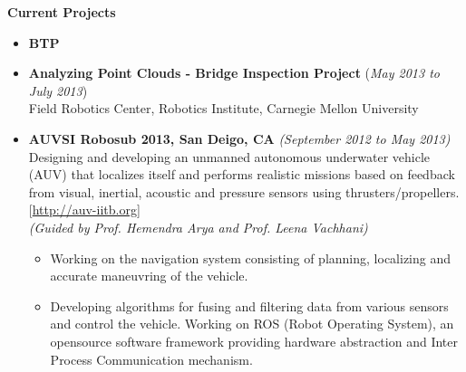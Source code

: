 \documentclass[a4paper,11pt]{article}
\newcommand{\resheading}[1]{{\small \colorbox{mygrey}{\begin{minipage}{0.975\textwidth}{\textbf{#1 \vphantom{p\^{E}}}}\end{minipage}}}}
\begin{document}
\resheading{\textbf{\large{Current Projects}}}
\begin{itemize}

    \item \textbf{BTP}

    \item \textbf{Analyzing Point Clouds - Bridge Inspection Project} \hfill (\emph{May 2013 to July 2013}) \\
        Field Robotics Center, Robotics Institute, Carnegie Mellon University 

    \item \textbf{AUVSI Robosub 2013, San Deigo, CA} \hfill \emph{(September 2012 to May 2013) } \\
        Designing and developing an unmanned autonomous underwater vehicle (AUV) that localizes itself and performs realistic missions based on feedback from visual, inertial, acoustic and pressure sensors using thrusters/propellers. \hfill  [\url{http://auv-iitb.org}] \\ 
        \emph{(Guided by Prof. Hemendra Arya and Prof. Leena Vachhani)} \\[-0.6cm]
        \begin{itemize}
            \item Working on the navigation system consisting of planning, localizing and accurate maneuvring of the vehicle.
            \item Developing algorithms for fusing and filtering data from various sensors and control the vehicle. Working on ROS (Robot Operating System), an opensource software framework providing hardware abstraction and Inter Process Communication mechanism.
        \end{itemize}
\begin{comment} %
\item \textbf{Robotic Sniffer Dog} \hfill \emph{(Guided by Prof. J. John and  D. Sharma, EE318 - Spring 2013)}
        \begin{itemize}
            \item Building a working prototype of a robotic control system which can be controlled from a considerable distance (using repeaters) through WLAN, Zigbee protocol relying on visual data from cameras.
            \item Consists of a sensor board which can detect explosive vapors in parts per billion. 
        \end{itemize}

\end{comment}
\end{itemize}
\end{document}
